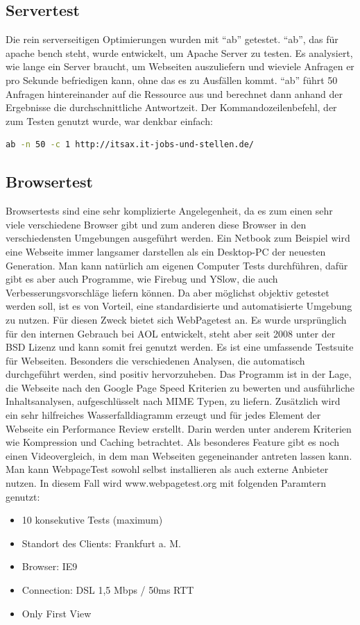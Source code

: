 \subsection{Servertest}
Die rein serverseitigen Optimierungen wurden mit ``ab'' getestet. ``ab'', das für apache bench steht, wurde entwickelt, um Apache Server zu testen. Es analysiert, wie lange ein Server braucht, um Webseiten auszuliefern und wieviele Anfragen er pro Sekunde befriedigen kann, ohne das es zu Ausfällen kommt. ``ab'' führt 50 Anfragen hintereinander auf die Ressource aus und berechnet dann anhand der Ergebnisse die durchschnittliche Antwortzeit. Der Kommandozeilenbefehl, der zum Testen genutzt wurde, war denkbar einfach:
\begin{lstlisting}[language=bash,label=ab mit Paramtern,caption=ab mit Parametern]
ab -n 50 -c 1 http://itsax.it-jobs-und-stellen.de/
\end{lstlisting}

\subsection{Browsertest}
Browsertests sind eine sehr komplizierte Angelegenheit, da es zum einen sehr viele verschiedene Browser gibt und zum anderen diese Browser in den verschiedensten Umgebungen ausgeführt werden. Ein Netbook zum Beispiel wird eine Webseite immer langsamer darstellen als ein Desktop-PC der neuesten Generation. Man kann natürlich am eigenen Computer Tests durchführen, dafür gibt es aber auch Programme, wie Firebug und YSlow, die auch Verbesserungsvorschläge liefern können. Da aber möglichst objektiv getestet werden soll, ist es von Vorteil, eine standardisierte und automatisierte Umgebung zu nutzen. Für diesen Zweck bietet sich WebPagetest an. Es wurde ursprünglich für den internen Gebrauch bei AOL entwickelt, steht aber seit 2008 unter der BSD Lizenz und kann somit frei genutzt werden. Es ist eine umfassende Testsuite für Webseiten. Besonders die verschiedenen Analysen, die automatisch durchgeführt werden, sind positiv hervorzuheben. Das Programm ist in der Lage, die Webseite nach den Google Page Speed Kriterien zu bewerten und ausführliche Inhaltsanalysen, aufgeschlüsselt nach MIME Typen, zu liefern. Zusätzlich wird ein sehr hilfreiches Wasserfalldiagramm erzeugt und für jedes Element der Webseite ein Performance Review erstellt. Darin werden unter anderem Kriterien wie Kompression und Caching betrachtet. Als besonderes Feature gibt es noch einen Videovergleich, in dem man Webseiten gegeneinander antreten lassen kann. Man kann WebpageTest sowohl selbst installieren als auch externe Anbieter nutzen. In diesem Fall wird www.webpagetest.org mit folgenden Paramtern genutzt:
\begin{itemize}
  \item 10 konsekutive Tests (maximum) 
  \item Standort des Clients: Frankfurt a. M.
  \item Browser: IE9
  \item Connection: DSL 1,5 Mbps / 50ms RTT
  \item Only First View
\end{itemize}
